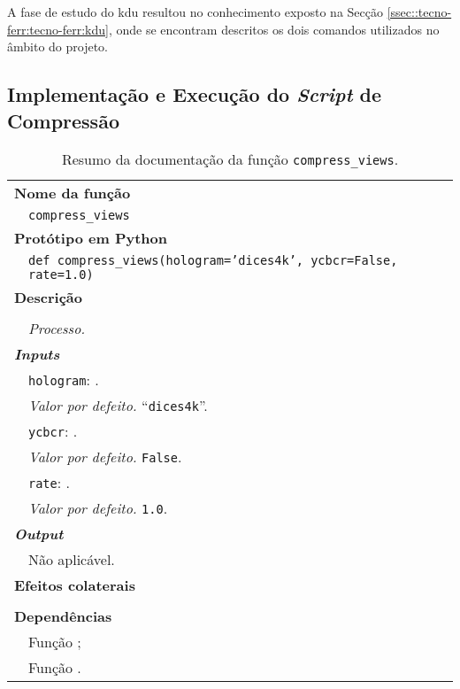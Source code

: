 A fase de estudo do \ac{kdu} resultou no conhecimento exposto na Secção \ref{ssec::tecno-ferr:tecno-ferr:kdu}, onde se encontram descritos os dois comandos utilizados no âmbito do projeto.


\subsection{Implementação e Execução do \textit{Script} de Compressão}
\label{ssec::imp-tes:holo-compress:script}

\begin{table}[!hp]
    \centering
    \caption{Resumo da documentação da função \texttt{compress\_views}.}
    \label{tab:compress_views}
    \begin{tabular}{p{1cm} p{10cm}}
        \hline
        \multicolumn{2}{l}{\bfseries Nome da função}\\
         & \verb|compress_views|\\
        \hline
        \multicolumn{2}{l}{\bfseries Protótipo em Python}\\
         & \texttt{def compress_views(hologram='dices4k', ycbcr=False, rate=1.0)} \\
        \hline\multicolumn{2}{l}{\bfseries Descrição}\\
         &  \\
         & \textit{Processo.} \\
        \hline\multicolumn{2}{l}{\bfseries \textit{Inputs}}\\
         & \verb|hologram|: .\\
         & \hspace{1cm} \textit{Valor por defeito.} ``\verb|dices4k|''.\\
         & \verb|ycbcr|: .\\
         & \hspace{1cm} \textit{Valor por defeito.} \verb|False|.\\
         & \verb|rate|: .\\
         & \hspace{1cm} \textit{Valor por defeito.} \verb|1.0|.\\
        \hline\multicolumn{2}{l}{\bfseries \textit{Output}}\\
         & Não aplicável.\\
        \hline\multicolumn{2}{l}{\bfseries Efeitos colaterais}\\
         & \\
        \hline\multicolumn{2}{l}{\bfseries Dependências}\\
         & Função \verb||; \\
         & Função \verb||. \\
        \hline
    \end{tabular}
\end{table}





